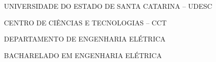

\renewcommand{\imprimircapa}{%
	\begin{capa}%
		\center

		{\fontseries{b}\selectfont\MakeTextUppercase{UNIVERSIDADE DO ESTADO DE SANTA CATARINA -- UDESC}}
		
		{\fontseries{b}\selectfont\MakeTextUppercase{Centro de Ciências e Tecnologias -- CCT  }}
		
		{\fontseries{b}\selectfont\MakeTextUppercase{Departamento de Engenharia Elétrica}}
		
        {\fontseries{b}\selectfont\MakeTextUppercase{bacharelado em Engenharia Elétrica}}
		\vfill
		
		{\fontseries{b}\selectfont\MakeTextUppercase{\normalsize\imprimirautor}}
		
		\vfill
		\begin{center}
			{\fontseries{b}\selectfont\MakeTextUppercase{\imprimirtitulo}}
		\end{center}
		\vfill
		
		\vfill
		
		{\fontseries{b}\selectfont\MakeTextUppercase{\imprimirlocal}}
		\par
		{\selectfont \imprimirdata}
		\vspace*{1cm}
	\end{capa}
}



\imprimircapa				%

